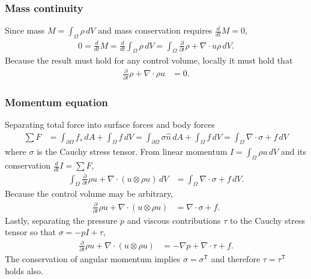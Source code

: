 \documentclass[letterpaper,11pt,nointlimits,reqno,draft]{amsart}
\newcommand{\trans}[1]{{#1}^{\ensuremath{\mathsf{T}}}}
\begin{document}
\subsubsection{Mass continuity}
Since mass $M=\int_{\Omega} \rho\,dV$
and mass conservation requires $\frac{d}{dt}M=0$,
\begin{align}
  0 = \frac{d}{dt}M
  = \frac{d}{dt}\int_{\Omega} \rho\,dV
  =
  \int_{\Omega}\frac{\partial}{\partial{}t}\rho+\nabla\cdot{}u\rho{}\,dV.
\end{align}
Because the result must hold for any control volume, locally it must hold that
\begin{align}
  \label{eq:cons_mass}
  \frac{\partial}{\partial{}t}\rho+\nabla\cdot\rho{}u &= 0
  .
\end{align}

\subsubsection{Momentum equation}
Separating total force into surface forces and body forces
\begin{align}
  \sum{}F
  &=
     \int_{\partial\Omega} f_s \, dA
   + \int_{\Omega} f \, dV
  =
     \int_{\partial\Omega} \sigma \hat{n} \, dA
  +  \int_{\Omega} f \, dV
  =  \int_{\Omega} \nabla\cdot\sigma + f \, dV
\end{align}
where $\sigma$ is the Cauchy stress tensor.  From linear momentum
$I=\int_{\Omega} \rho{}u\,dV$ and its conservation $\frac{d}{dt}I=\sum{}F$,
\begin{align}
    \int_{\Omega}\frac{\partial{}}{\partial{}t}\rho{}u
  + \nabla\cdot(u\otimes{}\rho{}u)\,dV
&= \int_{\Omega} \nabla\cdot\sigma + f \, dV
.
\end{align}
Because the control volume may be arbitrary,
\begin{align}
  \frac{\partial{}}{\partial{}t}\rho{}u + \nabla\cdot(u\otimes{}\rho{}u)
&= \nabla\cdot\sigma + f
.
\end{align}
Lastly, separating the pressure $p$ and viscous contributions $\tau$ to
the Cauchy stress tensor so that $\sigma = -p I + \tau$,
\begin{align}
\label{eq:cons_momentum}
\frac{\partial{}}{\partial{}t}\rho{}u + \nabla\cdot(u\otimes{}\rho{}u)
&= -\nabla{}p + \nabla\cdot{}\tau + f
.
\end{align}
The conservation of angular momentum implies $\sigma=\trans{\sigma}$ and
therefore $\tau=\trans{\tau}$ holds also.
\end{document}
